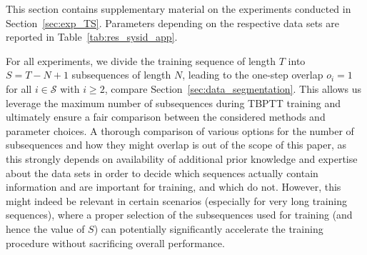 \documentclass{article} %
\begin{document}
This section contains supplementary material on the experiments conducted in Section~\ref{sec:exp_TS}. Parameters depending on the respective data sets are reported in Table~\ref{tab:res_sysid_app}.

For all experiments, we divide the training sequence of length $T$ into $S=T-N+1$ subsequences of length $N$, leading to the one-step overlap $o_i=1$ for all $i\in\mathcal{S}$ with $i\geq2$, compare Section~\ref{sec:data_segmentation}. This allows us leverage the maximum number of subsequences during TBPTT training and ultimately ensure a fair comparison between the considered methods and parameter choices. A thorough comparison of various options for the number of subsequences and how they might overlap is out of the scope of this paper, as this strongly depends on availability of additional prior knowledge and expertise about the data sets in order to decide which sequences actually contain information and are important for training, and which do not. However, this might indeed be relevant in certain scenarios (especially for very long training sequences), where a proper selection of the subsequences used for training (and hence the value of $S$) can potentially significantly accelerate the training procedure without sacrificing overall performance.
\end{document}
